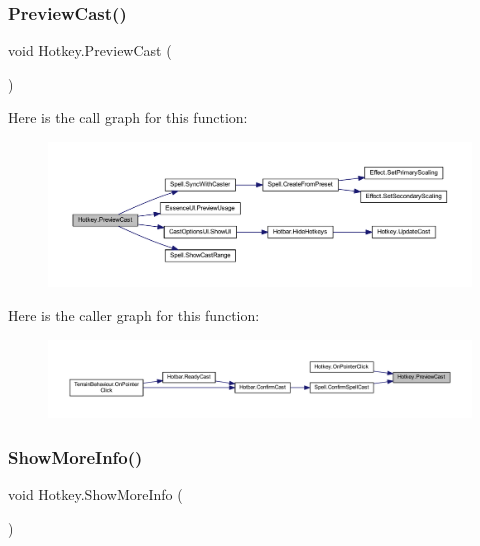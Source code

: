\subsubsection{\texorpdfstring{PreviewCast()}{PreviewCast()}}
{\footnotesize\ttfamily void Hotkey.\+Preview\+Cast (\begin{DoxyParamCaption}{ }\end{DoxyParamCaption})}

Here is the call graph for this function\+:
\nopagebreak
\begin{figure}[H]
\begin{center}
\leavevmode
\includegraphics[width=350pt]{class_hotkey_a209f6726592cf69b7e21bd68ced48cb3_cgraph}
\end{center}
\end{figure}
Here is the caller graph for this function\+:
\nopagebreak
\begin{figure}[H]
\begin{center}
\leavevmode
\includegraphics[width=350pt]{class_hotkey_a209f6726592cf69b7e21bd68ced48cb3_icgraph}
\end{center}
\end{figure}
\mbox{\label{class_hotkey_ae8ab38a3ddf49344ede61f8fb67892c5}} 
\subsubsection{\texorpdfstring{ShowMoreInfo()}{ShowMoreInfo()}}
{\footnotesize\ttfamily void Hotkey.\+Show\+More\+Info (\begin{DoxyParamCaption}{ }\end{DoxyParamCaption})}

\mbox{\label{class_hotkey_a15822d970e7f05f8ea8ef4069a4e245a}} 
